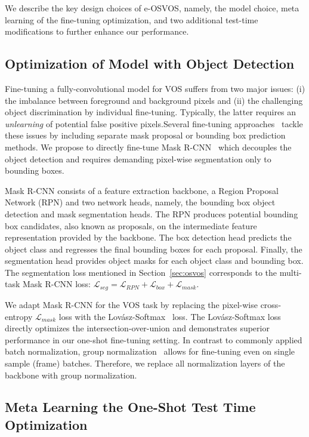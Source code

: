 \documentclass{article}
\begin{document}
    We describe the key design choices of e-OSVOS, namely, the model choice, meta learning of the fine-tuning optimization, and two additional test-time modifications to further enhance our performance.

\subsection{Optimization of Model with Object Detection} \label{sec:mask_rcnn}

    Fine-tuning a fully-convolutional model for VOS suffers from two major issues: (i) the imbalance between foreground and background pixels and (ii) the challenging object discrimination by individual fine-tuning.
Typically, the latter requires an \textit{unlearning} of potential false positive pixels.Several fine-tuning approaches~\cite{OSVOS-S,premvos,onavos} tackle these issues by including separate mask proposal or bounding box prediction methods.
We propose to directly fine-tune Mask R-CNN~\cite{MaskRCNN} which decouples the object detection and requires demanding pixel-wise segmentation only to bounding boxes.


    Mask R-CNN consists of a feature extraction backbone, a Region Proposal Network (RPN) and two network heads, namely, the bounding box object detection and mask segmentation heads.
The RPN produces potential bounding box candidates, also known as proposals, on the intermediate feature representation provided by the backbone.
The box detection head predicts the object class and regresses the final bounding boxes for each proposal. Finally, the segmentation head provides object masks for each object class and bounding box.
The segmentation loss mentioned in Section~\ref{sec:osvos} corresponds to the multi-task Mask R-CNN loss: $\mathcal{L}_{seg} = \mathcal{L}_{RPN} + \mathcal{L}_{box} + \mathcal{L}_{mask}$.


    We adapt Mask R-CNN for the VOS task by replacing the pixel-wise cross-entropy $\mathcal{L}_{mask}$ loss with the Lov{\'a}sz-Softmax~\cite{berman2018lovasz} loss.
The Lov{\'a}sz-Softmax loss directly optimizes the intersection-over-union and demonstrates superior performance in our one-shot fine-tuning setting.
In contrast to commonly applied batch normalization, group normalization~\cite{groupnorm} allows for fine-tuning even on single sample (frame) batches.
Therefore, we replace all normalization layers of the backbone with group normalization.

\subsection{Meta Learning the One-Shot Test Time Optimization}
\end{document}
